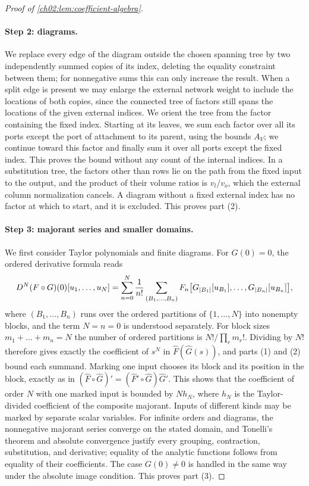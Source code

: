 \begin{proof}[Proof of \cref{ch02:lem:coefficient-algebra}]
\paragraph{Step 2: diagrams.} We replace every edge of the diagram outside the chosen spanning tree by two independently summed copies of its index, deleting the equality constraint between them; for nonnegative sums this can only increase the result. When a split edge is present we may enlarge the external network weight to include the locations of both copies, since the connected tree of factors still spans the locations of the given external indices. We orient the tree from the factor containing the fixed index. Starting at its leaves, we sum each factor over all its ports except the port of attachment to its parent, using the bounds $A_V$; we continue toward this factor and finally sum it over all ports except the fixed index. This proves the bound without any count of the internal indices. In a substitution tree, the factors other than rows lie on the path from the fixed input to the output, and the product of their volume ratios is $v_l/v_o$, which the external column normalization cancels. A diagram without a fixed external index has no factor at which to start, and it is excluded. This proves part (2).

\paragraph{Step 3: majorant series and smaller domains.} We first consider Taylor polynomials and finite diagrams. For $G(0)=0$, the ordered derivative formula reads
\[
 D^N(F\circ G)(0)[u_1,\dots,u_N]=\sum_{n=0}^N\frac1{n!}\sum_{(B_1,\dots,B_n)}F_n\bigl[G_{\lvert B_1\rvert}[u_{B_1}],\dots,G_{\lvert B_n\rvert}[u_{B_n}]\bigr],
\]
where $(B_1,\dots,B_n)$ runs over the ordered partitions of $\{1,\dots,N\}$ into nonempty blocks, and the term $N=n=0$ is understood separately. For block sizes $m_1+\dots+m_n=N$ the number of ordered partitions is $N!/\prod_rm_r!$. Dividing by $N!$ therefore gives exactly the coefficient of $s^N$ in $\widehat F(\widehat G(s))$, and parts (1) and (2) bound each summand. Marking one input chooses its block and its position in the block, exactly as in $(\widehat F\circ\widehat G)'=(\widehat F'\circ\widehat G)\widehat G'$. This shows that the coefficient of order $N$ with one marked input is bounded by $Nh_N$, where $h_N$ is the Taylor-divided coefficient of the composite majorant. Inputs of different kinds may be marked by separate scalar variables. For infinite orders and diagrams, the nonnegative majorant series converge on the stated domain, and Tonelli's theorem and absolute convergence justify every grouping, contraction, substitution, and derivative; equality of the analytic functions follows from equality of their coefficients. The case $G(0)\ne0$ is handled in the same way under the absolute image condition. This proves part (3).


\end{proof}

